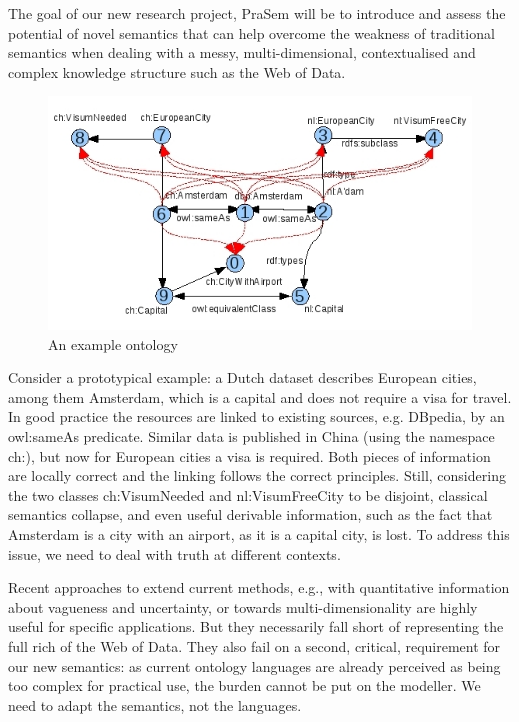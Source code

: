 \documentclass[letterpaper]{article}
\begin{document}
The goal of our new research project, PraSem will be to introduce and assess the potential of novel semantics that can help overcome the weakness of traditional semantics when dealing with a messy, multi-dimensional, contextualised and complex knowledge structure such as the Web of Data.

\begin{figure}[t]
\includegraphics[width=\linewidth]{ontology_part}
\caption{An example ontology}
	\label{fig:ontograph}
\end{figure}

Consider a prototypical example: a Dutch dataset describes European cities, among them Amsterdam, which is a capital and does not require a visa for travel. In good practice the resources are linked to existing sources, e.g. DBpedia, by an owl:sameAs predicate. Similar data is published in China (using the namespace ch:), but now for European cities a visa is required. Both pieces of information are locally correct and the linking follows the correct principles. Still, considering the two classes ch:VisumNeeded and nl:VisumFreeCity to be disjoint, classical semantics collapse, and even useful derivable information, such as the fact that Amsterdam is a city with an airport, as it is a capital city, is lost. To address this issue, we need to deal with truth at different contexts.

Recent approaches to extend current methods, e.g., with quantitative information about vagueness and uncertainty, or towards multi-dimensionality are highly useful for specific applications. But they necessarily fall short of representing the full rich of the Web of Data. They also fail on a second, critical, requirement for our new semantics: as current ontology languages are already perceived as being too complex for practical use, the burden cannot be put on the modeller. We need to adapt the semantics, not the languages.
\end{document}
